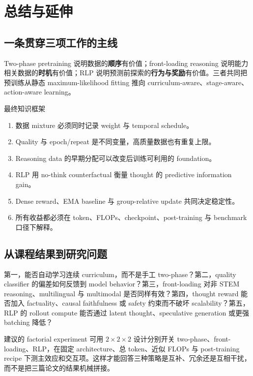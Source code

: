 \section{总结与延伸}

\subsection{一条贯穿三项工作的主线}

Two-phase pretraining 说明数据的\textbf{顺序}有价值；front-loading reasoning 说明能力相关数据的\textbf{时机}有价值；RLP 说明预测前探索的\textbf{行为与奖励}有价值。三者共同把预训练从静态 maximum-likelihood fitting 推向 curriculum-aware、stage-aware、action-aware learning。

\begin{importantbox}{最终知识框架}
\begin{enumerate}
  \item 数据 mixture 必须同时记录 weight 与 temporal schedule。
  \item Quality 与 epoch/repeat 是不同变量，高质量数据也有重复上限。
  \item Reasoning data 的早期分配可以改变后训练可利用的 foundation。
  \item RLP 用 no-think counterfactual 衡量 thought 的 predictive information gain。
  \item Dense reward、EMA baseline 与 group-relative update 共同决定稳定性。
  \item 所有收益都必须在 token、FLOPs、checkpoint、post-training 与 benchmark 口径下解释。
\end{enumerate}
\end{importantbox}

\subsection{从课程结果到研究问题}

第一，能否自动学习连续 curriculum，而不是手工 two-phase？第二，quality classifier 的偏差如何反馈到 model behavior？第三，front-loading 对非 STEM reasoning、multilingual 与 multimodal 是否同样有效？第四，thought reward 能否加入 factuality、causal faithfulness 或 safety 约束而不破坏 scalability？第五，RLP 的 rollout compute 能否通过 latent thought、speculative generation 或更强 batching 降低？

\begin{knowledgebox}{建议的 factorial experiment}
可用 $2\times2\times2$ 设计分别开关 two-phase、front-loading、RLP，在固定 architecture、总 token、近似 FLOPs 与 post-training recipe 下测主效应和交互项。这样才能回答三种策略是互补、冗余还是互相干扰，而不是把三篇论文的结果机械拼接。
\end{knowledgebox}

